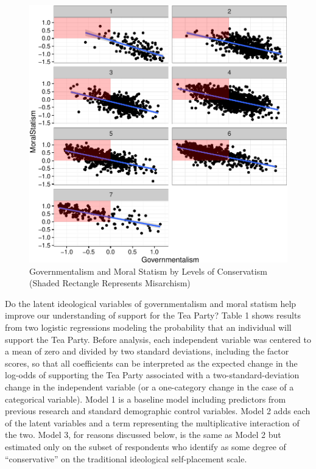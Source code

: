 \documentclass[12pt,]{article}
\begin{document}
\begin{figure}[htbp]
\centering
\includegraphics{figures/exploratoryplot-1.pdf}
\caption{Governmentalism and Moral Statism by Levels of Conservatism
(Shaded Rectangle Represents Misarchism)}
\end{figure}

Do the latent ideological variables of governmentalism and moral statism
help improve our understanding of support for the Tea Party? Table 1
shows results from two logistic regressions modeling the probability
that an individual will support the Tea Party. Before analysis, each
independent variable was centered to a mean of zero and divided by two
standard deviations, including the factor scores, so that all
coefficients can be interpreted as the expected change in the log-odds
of supporting the Tea Party associated with a two-standard-deviation
change in the independent variable (or a one-category change in the case
of a categorical variable). Model 1 is a baseline model including
predictors from previous research and standard demographic control
variables. Model 2 adds each of the latent variables and a term
representing the multiplicative interaction of the two. Model 3, for
reasons discussed below, is the same as Model 2 but estimated only on
the subset of respondents who identify as some degree of
``conservative'' on the traditional ideological self-placement scale.
\end{document}
